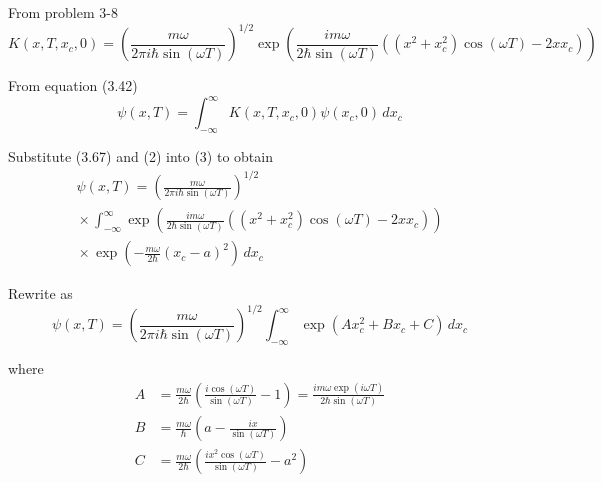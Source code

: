 


\bigskip
From problem 3-8
\begin{equation*}
K(x,T,x_c,0)=
\left(\frac{m\omega}{2\pi i\hbar\sin(\omega T)}\right)^{1/2}
\exp\left(
\frac{im\omega}{2\hbar\sin(\omega T)}\left((x^2+x_c^2)\cos(\omega T)-2xx_c\right)
\right)
\tag{2}
\end{equation*}

From equation (3.42)
\begin{equation*}
\psi(x,T)=\int_{-\infty}^\infty K(x,T,x_c,0)\psi(x_c,0)\,dx_c
\tag{3}
\end{equation*}

Substitute (3.67) and (2) into (3) to obtain
\begin{multline*}
\psi(x,T)=\left(\frac{m\omega}{2\pi i\hbar\sin(\omega T)}\right)^{1/2}
\\
{}\times
\int_{-\infty}^\infty
\exp\left(
\frac{im\omega}{2\hbar\sin(\omega T)}\left((x^2+x_c^2)\cos(\omega T)-2xx_c\right)
\right)
\\
{}\times
\exp\left(-\frac{m\omega}{2\hbar}(x_c-a)^2\right)\,dx_c
\end{multline*}

Rewrite as
\begin{equation*}
\psi(x,T)=\left(\frac{m\omega}{2\pi i\hbar\sin(\omega T)}\right)^{1/2}
\int_{-\infty}^\infty\exp(Ax_c^2+Bx_c+C)\,dx_c
\tag{4}
\end{equation*}

where
\begin{align*}
A&=\frac{m\omega}{2\hbar}\left(\frac{i\cos(\omega T)}{\sin(\omega T)}-1\right)
=\frac{im\omega\exp(i\omega T)}{2\hbar\sin(\omega T)}
\\
B&=\frac{m\omega}{\hbar}\left(a-\frac{ix}{\sin(\omega T)}\right)
\\
C&=\frac{m\omega}{2\hbar}\left(\frac{ix^2\cos(\omega T)}{\sin(\omega T)}-a^2\right)
\end{align*}

